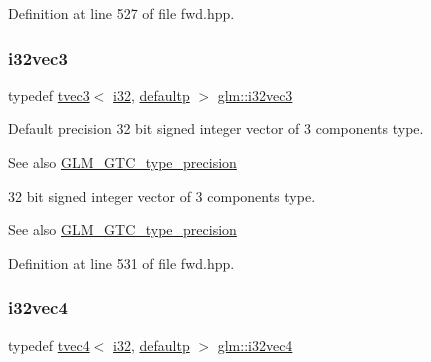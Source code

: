 Definition at line 527 of file fwd.\+hpp.

\mbox{\label{group__gtc__type__precision_gab67e08f6a4b1bce82a9a34ecb2bfba64}} 
\subsubsection{\texorpdfstring{i32vec3}{i32vec3}}
{\footnotesize\ttfamily typedef \mbox{\hyperlink{structglm_1_1tvec3}{tvec3}}$<$ \mbox{\hyperlink{group__gtc__type__precision_ga1d8ed5c43e91ea7d4528389da4fa9524}{i32}}, \mbox{\hyperlink{namespaceglm_a0f04f086094c747d227af4425893f545a9d21ccd8b5a009ec7eb7677befc3bf51}{defaultp}} $>$ \mbox{\hyperlink{group__gtc__type__precision_gab67e08f6a4b1bce82a9a34ecb2bfba64}{glm\+::i32vec3}}}

Default precision 32 bit signed integer vector of 3 components type. \begin{DoxySeeAlso}{See also}
\mbox{\hyperlink{group__gtc__type__precision}{G\+L\+M\+\_\+\+G\+T\+C\+\_\+type\+\_\+precision}}
\end{DoxySeeAlso}
32 bit signed integer vector of 3 components type. \begin{DoxySeeAlso}{See also}
\mbox{\hyperlink{group__gtc__type__precision}{G\+L\+M\+\_\+\+G\+T\+C\+\_\+type\+\_\+precision}} 
\end{DoxySeeAlso}


Definition at line 531 of file fwd.\+hpp.

\mbox{\label{group__gtc__type__precision_ga3ada3676600db65a425058c0a150d83e}} 
\subsubsection{\texorpdfstring{i32vec4}{i32vec4}}
{\footnotesize\ttfamily typedef \mbox{\hyperlink{structglm_1_1tvec4}{tvec4}}$<$ \mbox{\hyperlink{group__gtc__type__precision_ga1d8ed5c43e91ea7d4528389da4fa9524}{i32}}, \mbox{\hyperlink{namespaceglm_a0f04f086094c747d227af4425893f545a9d21ccd8b5a009ec7eb7677befc3bf51}{defaultp}} $>$ \mbox{\hyperlink{group__gtc__type__precision_ga3ada3676600db65a425058c0a150d83e}{glm\+::i32vec4}}}

